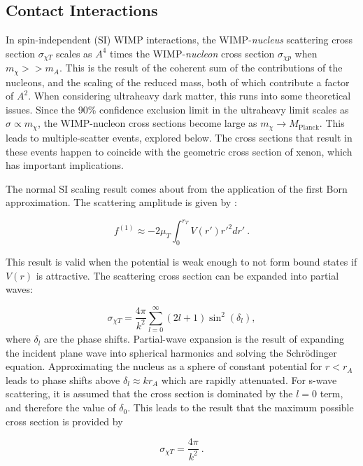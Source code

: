 \subsection{Contact Interactions}
\label{sec:contact_interactions}
In spin-independent (SI) WIMP interactions, the WIMP-\textit{nucleus} scattering cross section $\sigma_{\chi T}$ scales as $A^4$ times the WIMP-\textit{nucleon} cross section $\sigma_{\chi p}$ when $m_\chi >> m_A$.
This is the result of the coherent sum of the contributions of the nucleons, and the scaling of the reduced mass, both of which contribute a factor of $A^2$.
When considering ultraheavy dark matter, this runs into some theoretical issues.
Since the 90\% confidence exclusion limit in the ultraheavy limit scales as $\sigma \propto m_\chi$, the WIMP-nucleon cross sections become large as $m_\chi \rightarrow M_{\mathrm{Planck}}$.
This leads to multiple-scatter events, explored below.
The cross sections that result in these events happen to coincide with the geometric cross section of xenon, which has important implications.

The normal SI scaling result comes about from the application of the first Born approximation.
The scattering amplitude is given by :

\begin{equation}
    f^{(1)} \approx -2 \mu_T \int_0^{r_T} V(r')r'^2 dr'~.
\end{equation}

This result is valid when the potential is weak enough to not form bound states if $V(r)$ is attractive.
The scattering cross section can be expanded into partial waves:

\begin{equation}
    \sigma_{\chi T} = \frac{4 \pi}{k^2} \sum_{l=0}^{\infty} (2l+1) \sin^2(\delta_l),
\end{equation}
\noindent
where $\delta_l$ are the phase shifts. 
Partial-wave expansion is the result of expanding the incident plane wave into spherical harmonics and solving the Schr{\"o}dinger equation.
Approximating the nucleus as a sphere of constant potential for $r < r_A$ leads to phase shifts above $\delta_l \approx kr_A$ which are rapidly attenuated.
For s-wave scattering, it is assumed that the cross section is dominated by the  $l=0$ term, and therefore the value of $\delta_0$.
This leads to the result that the maximum possible cross section is provided by

\begin{equation}
    \sigma_{\chi T} = \frac{4 \pi}{k^2} ~.
\end{equation}

